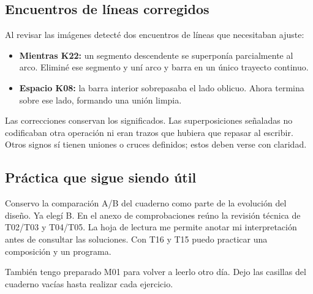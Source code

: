 \subsection{Encuentros de líneas corregidos}
Al revisar las imágenes detecté dos encuentros de líneas que necesitaban ajuste:
\begin{itemize}
\item \textbf{Mientras K22:} un segmento descendente se superponía parcialmente al
arco. Eliminé ese segmento y uní arco y barra en un único trayecto continuo.
\item \textbf{Espacio K08:} la barra interior sobrepasaba el lado oblicuo. Ahora
termina sobre ese lado, formando una unión limpia.
\end{itemize}
Las correcciones conservan los significados. Las superposiciones señaladas no
codificaban otra operación ni eran trazos que hubiera que repasar al escribir.
Otros signos sí tienen uniones o cruces definidos; estos deben verse con claridad.

\subsection{Práctica que sigue siendo útil}
Conservo la comparación A/B del cuaderno como parte de la evolución del diseño.
Ya elegí B. En el anexo de comprobaciones reúno la revisión técnica de T02/T03
y T04/T05. La hoja de lectura me permite anotar mi interpretación antes de
consultar las soluciones. Con T16 y T15 puedo practicar una composición y un programa.

También tengo preparado M01 para volver a leerlo otro día. Dejo las casillas
del cuaderno vacías hasta realizar cada ejercicio.
